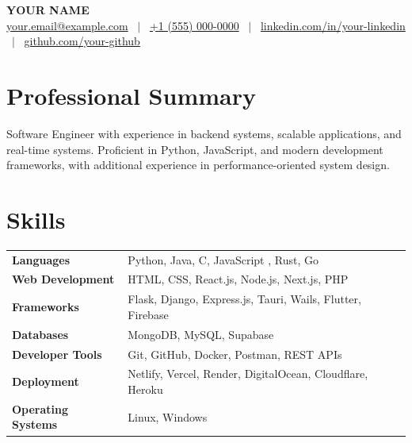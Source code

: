 \documentclass[a4paper,10pt]{article}
\begin{document}
\pagestyle{empty}

\begin{center}
{\LARGE \textbf{YOUR NAME}}\\[3pt]
\href{mailto:your.email@example.com}{your.email@example.com}
~$|$~
\href{tel:+910000085302}{+1 (555) 000-0000}
~$|$~
\href{https://www.linkedin.com/in/your-linkedin/}{linkedin.com/in/your-linkedin}
~$|$~
\href{https://github.com/your-github}{github.com/your-github}
\end{center}

\vspace{-5pt}

\section*{Professional Summary}

Software Engineer with experience in backend systems, scalable applications, and real-time systems. Proficient in Python, JavaScript, and modern development frameworks, with additional experience in performance-oriented system design.

\section*{Skills}

\renewcommand{\arraystretch}{1.0}
\begin{tabular}{@{} >{\bfseries}p{3.8cm} p{13cm} @{}}
Languages           & Python, Java, C, JavaScript , Rust, Go\\
Web Development     & HTML, CSS, React.js, Node.js, Next.js, PHP \\
Frameworks          & Flask, Django, Express.js, Tauri, Wails, Flutter, Firebase \\
Databases           & MongoDB, MySQL, Supabase \\
Developer Tools     & Git, GitHub, Docker, Postman, REST APIs \\
Deployment          & Netlify, Vercel, Render, DigitalOcean, Cloudflare, Heroku \\
Operating Systems   & Linux, Windows \\
\end{tabular}
\end{document}
